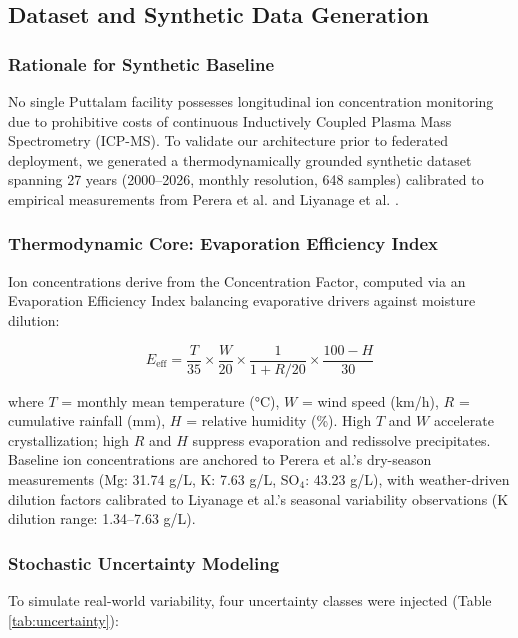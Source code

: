 \documentclass[conference]{IEEEtran}
\begin{document}
\subsection{Dataset and Synthetic Data Generation}

\subsubsection{Rationale for Synthetic Baseline}
No single Puttalam facility possesses longitudinal ion concentration monitoring due to prohibitive costs of continuous Inductively Coupled Plasma Mass Spectrometry (ICP-MS). To validate our architecture prior to federated deployment, we generated a thermodynamically grounded synthetic dataset spanning 27 years (2000–2026, monthly resolution, 648 samples) calibrated to empirical measurements from Perera et al. \cite{perera2019} and Liyanage et al. \cite{liyanage2021}.

\subsubsection{Thermodynamic Core: Evaporation Efficiency Index}
Ion concentrations derive from the Concentration Factor, computed via an Evaporation Efficiency Index balancing evaporative drivers against moisture dilution:

\begin{equation}
E_{\text{eff}} = \frac{T}{35} \times \frac{W}{20} \times \frac{1}{1 + R/20} \times \frac{100 - H}{30}
\end{equation}

where $T$ = monthly mean temperature (°C), $W$ = wind speed (km/h), $R$ = cumulative rainfall (mm), $H$ = relative humidity (\%). High $T$ and $W$ accelerate crystallization; high $R$ and $H$ suppress evaporation and redissolve precipitates. Baseline ion concentrations are anchored to Perera et al.'s \cite{perera2019} dry-season measurements (Mg: 31.74 g/L, K: 7.63 g/L, SO$_4$: 43.23 g/L), with weather-driven dilution factors calibrated to Liyanage et al.'s \cite{liyanage2021} seasonal variability observations (K dilution range: 1.34–7.63 g/L).

\subsubsection{Stochastic Uncertainty Modeling}
To simulate real-world variability, four uncertainty classes were injected (Table \ref{tab:uncertainty}):
\end{document}
